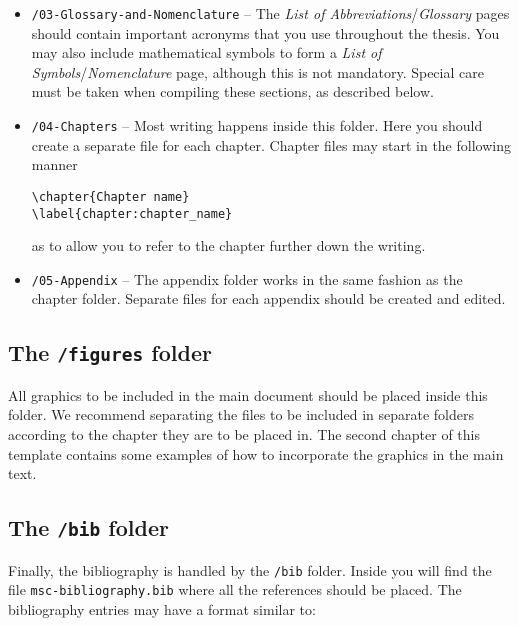 \begin{itemize}
\item \texttt{/03-Glossary-and-Nomenclature} -- The \textit{List of Abbreviations}/\textit{Glossary} pages should contain important acronyms that you use throughout the thesis. You may also include mathematical symbols to form a \textit{List of Symbols}/\textit{Nomenclature} page, although this is not mandatory. Special care must be taken when compiling these sections, as described below.

\item \texttt{/04-Chapters} -- Most writing happens inside this folder. Here you should create a separate file for each chapter. Chapter files may start in the following manner

\begin{verbatim}
\chapter{Chapter name}
\label{chapter:chapter_name}
\end{verbatim}


\noindent as to allow you to refer to the chapter further down the writing.

\item \texttt{/05-Appendix} -- The appendix folder works in the same fashion as the chapter folder. Separate files for each appendix should be created and edited.
\end{itemize}

\subsection{The {\normalfont\texttt{/figures}} folder} %
%
All graphics to be included in the main document should be placed inside this folder. We recommend separating the files to be included in separate folders according to the chapter they are to be placed in. The second chapter of this template contains some examples of how to incorporate the graphics in the main text.

\subsection{The {\normalfont\texttt{/bib}} folder} %

Finally, the bibliography is handled by the \texttt{/bib} folder. Inside you will find the file \texttt{msc-bibliography.bib} where all the references should be placed. The bibliography entries may have a format similar to:


